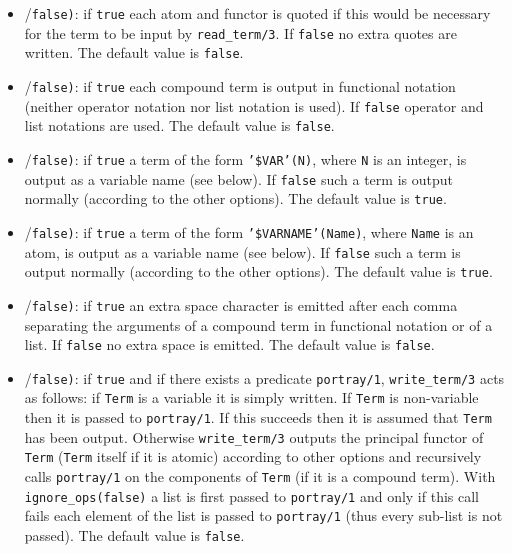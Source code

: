 \begin{itemize}

\item {}/\texttt{false)}: if \texttt{true} each
atom and functor is quoted if this would be necessary for the term to be
input by \texttt{read\_term/3}. If \texttt{false} no extra quotes are
written. The default value is \texttt{false}.

\item {}/\texttt{false)}: if
\texttt{true} each compound term is output in functional notation (neither
operator notation nor list notation is used). If \texttt{false} operator and
list notations are used. The default value is \texttt{false}.

\item {}/\texttt{false)}: if
\texttt{true} a term of the form \texttt{'\$VAR'(N)}, where \texttt{N} is an
integer, is output as a variable name (see below). If \texttt{false}
such a term is output normally (according to the other options). The
default value is
\texttt{true}.

\item {}/\texttt{false)}: if \texttt{true} a
term of the form \texttt{'\$VARNAME'(Name)}, where \texttt{Name} is an atom,
is output as a variable name (see below). If \texttt{false} such a term is
output normally (according to the other options). The default value is
\texttt{true}.

\item {}/\texttt{false)}: if
\texttt{true} an extra space character is emitted after each comma
separating the arguments of a compound term in functional notation or of a
list. If \texttt{false} no extra space is emitted. The default value is
\texttt{false}.

\item {}/\texttt{false)}: if \texttt{true}
and if there exists a predicate \texttt{portray/1}, \texttt{write\_term/3}
acts as follows: if \texttt{Term} is a variable it is simply written. If
\texttt{Term} is non-variable then it is passed to \texttt{portray/1}. If
this succeeds then it is assumed that \texttt{Term} has been output.
Otherwise \texttt{write\_term/3} outputs the principal functor of
\texttt{Term} (\texttt{Term} itself if it is atomic) according to other
options and recursively calls \texttt{portray/1} on the components of
\texttt{Term} (if it is a compound term). With \texttt{ignore\_ops(false)} a
list is first passed to \texttt{portray/1} and only if this call fails each
element of the list is passed to \texttt{portray/1} (thus every sub-list is
not passed). The default value is \texttt{false}.


\end{itemize}
